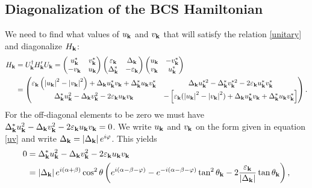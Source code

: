  \subsection{Diagonalization of the BCS Hamiltonian}
 \label{sec:Diag}
 We need to find what values of $u_{\mathbf{k}}$ and $v_{\mathbf{k}}$ that will satisfy the relation \eqref{unitary} and diagonalize  $H_{\mathbf{k}}$:
\begin{equation}
\begin{split}
    H_{\mathbf{k}} &= 
    U_{\mathbf{k}}^{\dagger}H_{\mathbf{k}}'U_{\mathbf{k}} = 
    \begin{pmatrix}
        u_{\mathbf{k}}^* & v_{\mathbf{k}}^* \\
        -v_{\mathbf{k}} & u_{\mathbf{k}}
    \end{pmatrix}
    \begin{pmatrix}
        \varepsilon_{\bf{k}} & \Delta_{\bf{k}}\\
        \Delta_{\bf{k}}^* & -\varepsilon_{\bf{k}} 
    \end{pmatrix}
    \begin{pmatrix}
        u_{\mathbf{k}} & -v_{\mathbf{k}}^* \\
        v_{\mathbf{k}} & u^*_{\mathbf{k}}
    \end{pmatrix}
    \\
    &=
    \begin{pmatrix}
        \varepsilon_{\mathbf{k}}\left(\left|u_{\mathbf{k}}\right|^2 - \left|v_{\mathbf{k}}\right|^2 \right) + \Delta_{\mathbf{k}}u^*_{\mathbf{k}}v_{\mathbf{k}} + \Delta_{\mathbf{k}}^*u_{\mathbf{k}}v^*_{\mathbf{k}}
        &
        \Delta_{\mathbf{k}}u_{\mathbf{k}}^{*2} - \Delta_{\mathbf{k}}^*v^{*2}_{\mathbf{k}}-2\varepsilon_{\mathbf{k}}u^*_{\mathbf{k}}v_{\mathbf{k}}^*
        \\
        \Delta_{\mathbf{k}}^*u^2_{\mathbf{k}} - \Delta_{\mathbf{k}}v_{\mathbf{k}}^2 -2\varepsilon_{\mathbf{k}}u_{\mathbf{k}}v_{\mathbf{k}}
        &
        -\left[\varepsilon_{\mathbf{k}}(\left|u_{\mathbf{k}}\right|^2 - \left|v_{\mathbf{k}}\right|^2) + \Delta_{\mathbf{k}}u^*_{\mathbf{k}}v_{\mathbf{k}} + \Delta_{\mathbf{k}}^*u_{\mathbf{k}}v^*_{\mathbf{k}}\right]
    \end{pmatrix}.
\end{split}
\label{Hk}
\end{equation}
For the off-diagonal elements to be zero we must have $\Delta^*_{\mathbf{k}}u_{\mathbf{k}}^2 - \Delta_{\mathbf{k}}v^2_{\mathbf{k}} - 2\varepsilon_{\mathbf{k}}u_{\mathbf{k}}v_{\mathbf{k}}= 0$. We write $u_{\mathbf{k}}$ and $v_{\mathbf{k}}$ on the form given in equation \eqref{uv} and write $\Delta_{\mathbf{k}} = \left|\Delta_{\mathbf{k}}\right|e^{i\varphi}$. This yields
\begin{equation*}
\begin{split}
    0 &= \Delta^*_{\mathbf{k}}u_{\mathbf{k}}^2 - \Delta_{\mathbf{k}}v^2_{\mathbf{k}} - 2\varepsilon_{\mathbf{k}}u_{\mathbf{k}}v_{\mathbf{k}}
    \\
    &= \left|\Delta_{\mathbf{k}}\right|e^{i(\alpha+\beta)}\cos^2\theta
    \left(e^{i(\alpha-\beta-\varphi)} - e^{-i(\alpha-\beta-\varphi)}\tan^2\theta_{\mathbf{k}} - 2\frac{\varepsilon_{\mathbf{k}}}{\left|\Delta_{\mathbf{k}}\right|}\tan\theta_{\mathbf{k}}\right),
\end{split}
\end{equation*}
